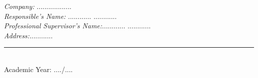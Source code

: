 \vspace*{0.4cm}

\begin{minipage}{0.9\textwidth}
  \begin{flushleft} \Large
  \emph{Company:} .................. \\ %
  \vspace*{0.4cm}
  \emph{ Responsible's Name:} ............ \textsc{............ } \\
  \vspace*{0.4cm}
  \emph{Professional Supervisor's Name:}............ \textsc{............ } \\   
  \vspace*{0.4cm}
  \emph{Address:}............  \\
  \end{flushleft}
\end{minipage}%

\begin{center}
\vspace*{0.7cm}
\rule{45mm}{.3pt}\\
\vspace*{0.3cm}
{\large Academic Year: ..../.... }\\
\end{center}